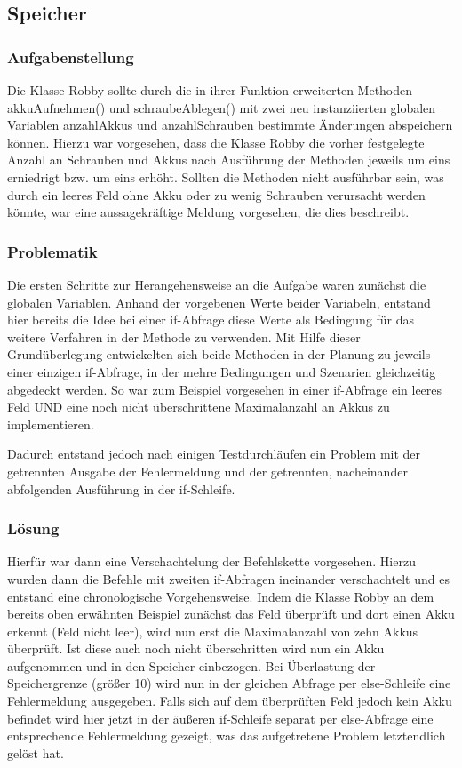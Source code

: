 \subsection{Speicher}

\subsubsection*{Aufgabenstellung}
Die Klasse Robby sollte durch die in ihrer Funktion erweiterten Methoden akkuAufnehmen() und schraubeAblegen() mit zwei neu instanziierten globalen Variablen anzahlAkkus und anzahlSchrauben bestimmte Änderungen abspeichern können.
Hierzu war vorgesehen, dass die Klasse Robby die vorher festgelegte Anzahl an Schrauben und Akkus nach Ausführung der Methoden jeweils um eins erniedrigt bzw. um eins erhöht. Sollten die Methoden nicht ausführbar sein, was durch ein leeres Feld ohne Akku oder zu wenig Schrauben verursacht werden könnte, war eine aussagekräftige Meldung vorgesehen, die dies beschreibt.


\subsubsection*{Problematik}
Die ersten Schritte zur Herangehensweise an die Aufgabe waren zunächst die globalen Variablen. Anhand der vorgebenen Werte beider Variabeln, entstand hier bereits die Idee bei einer if-Abfrage diese Werte als Bedingung für das weitere Verfahren in der Methode zu verwenden.
Mit Hilfe dieser Grundüberlegung entwickelten sich beide Methoden in der Planung zu jeweils einer einzigen if-Abfrage, in der mehre Bedingungen und Szenarien gleichzeitig abgedeckt werden. So war zum Beispiel vorgesehen in einer if-Abfrage ein leeres Feld UND eine noch nicht überschrittene Maximalanzahl an Akkus zu implementieren.

Dadurch entstand jedoch nach einigen Testdurchläufen ein Problem mit der getrennten Ausgabe der Fehlermeldung und der getrennten, nacheinander abfolgenden Ausführung in der if-Schleife.

\subsubsection*{Lösung}
Hierfür war dann eine Verschachtelung der Befehlskette vorgesehen.
Hierzu wurden dann die Befehle mit zweiten if-Abfragen ineinander verschachtelt und es entstand eine chronologische Vorgehensweise.
Indem die Klasse Robby an dem bereits oben erwähnten Beispiel zunächst das Feld überprüft und dort einen Akku erkennt (Feld nicht leer), wird nun erst die Maximalanzahl von zehn Akkus überprüft. Ist diese auch noch nicht überschritten wird nun ein Akku aufgenommen und in den Speicher einbezogen. Bei Überlastung der Speichergrenze (größer 10) wird nun in der gleichen Abfrage per else-Schleife eine Fehlermeldung ausgegeben.
Falls sich auf dem überprüften Feld jedoch kein Akku befindet wird hier jetzt in der äußeren if-Schleife separat per else-Abfrage eine entsprechende Fehlermeldung gezeigt, was das aufgetretene Problem letztendlich gelöst hat.

